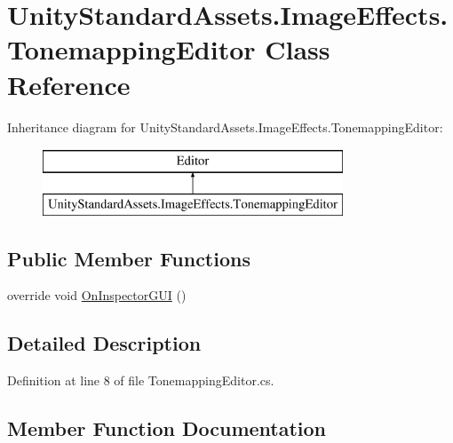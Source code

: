 \hypertarget{class_unity_standard_assets_1_1_image_effects_1_1_tonemapping_editor}{}\section{Unity\+Standard\+Assets.\+Image\+Effects.\+Tonemapping\+Editor Class Reference}
\label{class_unity_standard_assets_1_1_image_effects_1_1_tonemapping_editor}
Inheritance diagram for Unity\+Standard\+Assets.\+Image\+Effects.\+Tonemapping\+Editor\+:\begin{figure}[H]
\begin{center}
\leavevmode
\includegraphics[height=2.000000cm]{class_unity_standard_assets_1_1_image_effects_1_1_tonemapping_editor}
\end{center}
\end{figure}
\subsection*{Public Member Functions}
\begin{DoxyCompactItemize}
\item 
override void \mbox{\hyperlink{class_unity_standard_assets_1_1_image_effects_1_1_tonemapping_editor_a5a4748ca258fe6d1e07497463ba23cb4}{On\+Inspector\+G\+UI}} ()
\end{DoxyCompactItemize}


\subsection{Detailed Description}


Definition at line 8 of file Tonemapping\+Editor.\+cs.



\subsection{Member Function Documentation}
\mbox{\label{class_unity_standard_assets_1_1_image_effects_1_1_tonemapping_editor_a5a4748ca258fe6d1e07497463ba23cb4}} 
